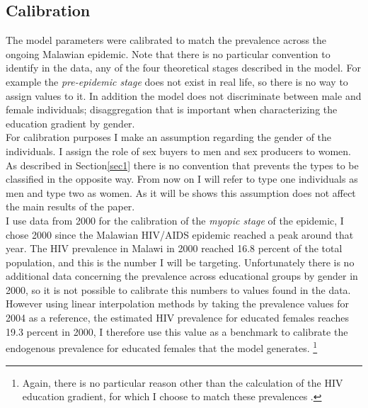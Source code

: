 \subsection{Calibration}\label{calibration}
The model parameters were calibrated to match the prevalence across the ongoing Malawian epidemic. Note that there is no particular convention to identify in the data, any of the four theoretical stages described in the model. For example the \textit{pre-epidemic stage} does not exist in real life, so there is no way to assign values to it. In addition the model does not discriminate between male and female individuals; disaggregation that is important when characterizing the education gradient by gender.\\

For calibration purposes I make an assumption regarding the gender of the individuals. I assign the role of sex buyers to men and sex producers to women. As described in Section\ref{sec1} there is no convention that prevents the types to be classified in the opposite way. From now on I will refer to type one individuals as men and type two as women. As it will be shows this assumption does not affect the main results of the paper.\\

  I use data from 2000 for the calibration of  the \textit{myopic stage} of the epidemic, I chose 2000 since the Malawian HIV/AIDS epidemic reached a peak around that year. The HIV prevalence in Malawi in 2000 reached 16.8 percent of the total population, and this is the number I will be targeting. Unfortunately there is no additional data concerning the prevalence across educational groups by gender in 2000, so it is not possible to calibrate this numbers to values found in the data. However using linear interpolation methods by taking the prevalence values for 2004 as a reference, the estimated HIV prevalence for educated females reaches 19.3 percent in 2000, I therefore use this value as a benchmark to calibrate the endogenous prevalence for educated females that the model  generates. \footnote{Again, there is no particular reason other than the calculation of the HIV education gradient, for which I choose to match these prevalences .}\\
  
